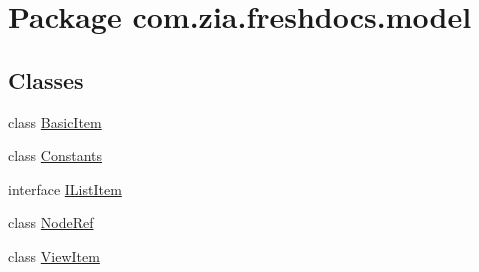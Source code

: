 \hypertarget{namespacecom_1_1zia_1_1freshdocs_1_1model}{\section{Package com.\-zia.\-freshdocs.\-model}
\label{namespacecom_1_1zia_1_1freshdocs_1_1model}
}
\subsection*{Classes}
\begin{DoxyCompactItemize}
\item 
class \hyperlink{classcom_1_1zia_1_1freshdocs_1_1model_1_1_basic_item}{Basic\-Item}
\item 
class \hyperlink{classcom_1_1zia_1_1freshdocs_1_1model_1_1_constants}{Constants}
\item 
interface \hyperlink{interfacecom_1_1zia_1_1freshdocs_1_1model_1_1_i_list_item}{I\-List\-Item}
\item 
class \hyperlink{classcom_1_1zia_1_1freshdocs_1_1model_1_1_node_ref}{Node\-Ref}
\item 
class \hyperlink{classcom_1_1zia_1_1freshdocs_1_1model_1_1_view_item}{View\-Item}
\end{DoxyCompactItemize}
